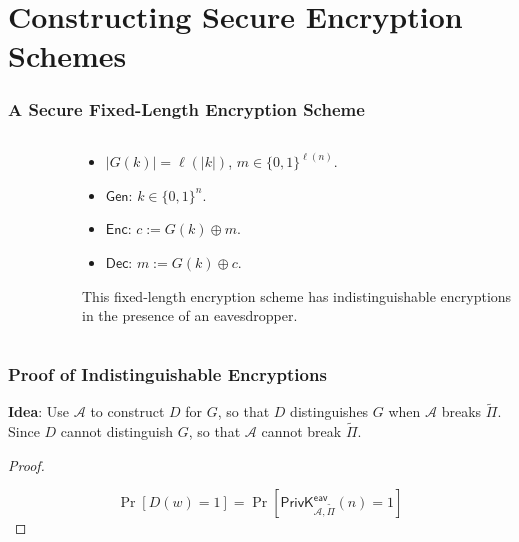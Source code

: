 \section{Constructing Secure Encryption Schemes}
\begin{frame}\frametitle{A Secure Fixed-Length Encryption Scheme}
\begin{columns}[t]
\begin{column}{4cm}
\begin{figure}
\begin{center}

\end{center}
\end{figure}
\end{column}
\begin{column}{6cm}
\begin{construction}\label{con:fl}
\begin{itemize}
\item $|G(k)| = \ell(|k|)$, $m \in \{0,1\}^{\ell(n)}$.
\item $\mathsf{Gen}$: $k \in \{0,1\}^n$.
\item $\mathsf{Enc}$: $c := G(k)\oplus m$.
\item $\mathsf{Dec}$: $m := G(k)\oplus c$.
\end{itemize}
\end{construction}
\begin{theorem}\label{the:flt}
This fixed-length encryption scheme has indistinguishable encryptions in the presence of an eavesdropper.
\end{theorem}
\end{column}
\end{columns}
\end{frame}
\begin{frame}\frametitle{Proof of Indistinguishable Encryptions}
\textbf{Idea}: Use $\mathcal{A}$ to construct $D$ for $G$, so that $D$ distinguishes $G$ when $\mathcal{A}$ breaks $\tilde{\Pi}$. Since $D$ cannot distinguish $G$, so that $\mathcal{A}$ cannot break $\tilde{\Pi}$.
\begin{proof}
\begin{figure}
\begin{center}

\end{center}
\end{figure}
\[ \Pr[D(w)=1] = \Pr[\mathsf{PrivK}^{\mathsf{eav}}_{\mathcal{A},\tilde{\Pi}}(n)=1] \]
\end{proof}
\end{frame}

